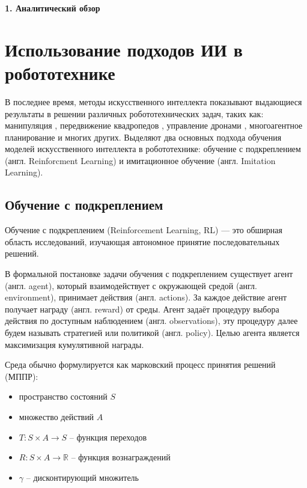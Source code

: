 \newpage
\begin{center}
  \textbf{\large 1. Аналитический обзор }
\end{center}

\section{Использование подходов ИИ в робототехнике}

    В последнее время, методы искусственного интеллекта показывают выдающиеся результаты в решении различных робототехнических задач, таких как: манипуляция \cite{related-manipulation-1, related-manipulation-2}, передвижение квадропедов \cite{related-locomotion-1, related-locomotion-2}, управление дронами \cite{related-drone-1, related-drone-2}, многоагентное планирование \cite{related-multi-agent-1, related-multi-agent-2} и многих других. Выделяют два основных подхода обучения моделей искусственного интеллекта в робототехнике: обучение с подкреплением (англ. Reinforcment Learning) и имитационное обучение (англ. Imitation Learning). 

    \subsection{Обучение с подкреплением}

        Обучение с подкреплением (Reinforcement Learning, RL) — это обширная область исследований, изучающая автономное принятие последовательных решений.

        В формальной постановке задачи обучения с подкреплением существует агент (англ. agent), который взаимодействует с окружающей средой (англ. environment), принимает действия (англ. actions). За каждое действие агент получает награду (англ. reward) от среды. Агент задаёт процедуру выбора действия по доступным наблюдением (англ. observations), эту процедуру далее будем называть стратегией или политикой (англ. policy). Целью агента является максимизация кумулятивной награды.  
        
        Среда обычно формулируется как марковский процесс принятия решений (МППР):

        \begin{itemize}
            \item пространство состояний $S$ 
            \item множество действий $A$
            \item $T: S \times A \to S$ -- функция переходов
            \item $R: S \times A \to \mathbb{R}$  -- функция вознаграждений
            \item $\gamma$ -- дисконтирующий множитель
        \end{itemize}

